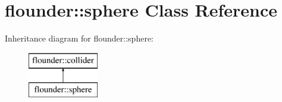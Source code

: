 \hypertarget{classflounder_1_1sphere}{}\section{flounder\+:\+:sphere Class Reference}
\label{classflounder_1_1sphere}
Inheritance diagram for flounder\+:\+:sphere\+:\begin{figure}[H]
\begin{center}
\leavevmode
\includegraphics[height=2.000000cm]{classflounder_1_1sphere}
\end{center}
\end{figure}
